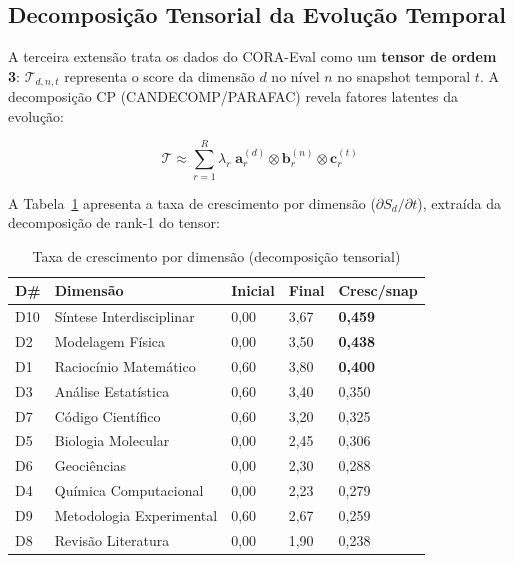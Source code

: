 \subsection{Decomposição Tensorial da Evolução Temporal}

A terceira extensão trata os dados do CORA-Eval como um \textbf{tensor de
ordem 3}: $\mathcal{T}_{d,n,t}$ representa o score da dimensão $d$ no nível
$n$ no snapshot temporal $t$. A decomposição CP (CANDECOMP/PARAFAC) revela
fatores latentes da evolução:

\begin{equation}\label{eq:tensor}
\mathcal{T} \approx \sum_{r=1}^{R} \lambda_r \; \mathbf{a}_r^{(d)} \otimes \mathbf{b}_r^{(n)} \otimes \mathbf{c}_r^{(t)}
\end{equation}

A Tabela~\ref{tab:tensor_trends} apresenta a taxa de crescimento por dimensão
($\partial S_d / \partial t$), extraída da decomposição de rank-1 do tensor:

\begin{table}[H]\centering
\caption{Taxa de crescimento por dimensão (decomposição tensorial)}
\label{tab:tensor_trends}
\begin{tabular}{p{}p{}p{}p{}p{}}
\toprule
\textbf{D\#} & \textbf{Dimensão} & \textbf{Inicial} & \textbf{Final} & \textbf{Cresc/snap} \\
\midrule
D10 & Síntese Interdisciplinar & 0,00 & 3,67 & \textbf{0,459} \\
D2  & Modelagem Física        & 0,00 & 3,50 & \textbf{0,438} \\
D1  & Raciocínio Matemático   & 0,60 & 3,80 & \textbf{0,400} \\
D3  & Análise Estatística     & 0,60 & 3,40 & 0,350 \\
D7  & Código Científico       & 0,60 & 3,20 & 0,325 \\
D5  & Biologia Molecular      & 0,00 & 2,45 & 0,306 \\
D6  & Geociências             & 0,00 & 2,30 & 0,288 \\
D4  & Química Computacional   & 0,00 & 2,23 & 0,279 \\
D9  & Metodologia Experimental & 0,60 & 2,67 & 0,259 \\
D8  & Revisão Literatura      & 0,00 & 1,90 & 0,238 \\
\bottomrule
\end{tabular}
\end{table}

